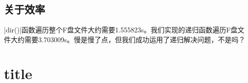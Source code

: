\subsection*{关于效率}
\Matlabinline|dir()|函数遍历整个F盘文件大约需要1.555823s。我们实现的递归函数遍历F盘文件大约需要3.703009s。慢是慢了点，但我们成功运用了递归解决问题，不是吗？

\section{title}